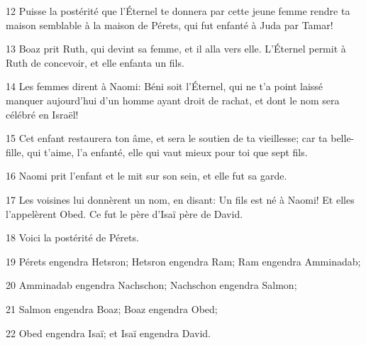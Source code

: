 \par 12 Puisse la postérité que l'Éternel te donnera par cette jeune femme rendre ta maison semblable à la maison de Pérets, qui fut enfanté à Juda par Tamar!
\par 13 Boaz prit Ruth, qui devint sa femme, et il alla vers elle. L'Éternel permit à Ruth de concevoir, et elle enfanta un fils.
\par 14 Les femmes dirent à Naomi: Béni soit l'Éternel, qui ne t'a point laissé manquer aujourd'hui d'un homme ayant droit de rachat, et dont le nom sera célébré en Israël!
\par 15 Cet enfant restaurera ton âme, et sera le soutien de ta vieillesse; car ta belle-fille, qui t'aime, l'a enfanté, elle qui vaut mieux pour toi que sept fils.
\par 16 Naomi prit l'enfant et le mit sur son sein, et elle fut sa garde.
\par 17 Les voisines lui donnèrent un nom, en disant: Un fils est né à Naomi! Et elles l'appelèrent Obed. Ce fut le père d'Isaï père de David.
\par 18 Voici la postérité de Pérets.
\par 19 Pérets engendra Hetsron; Hetsron engendra Ram; Ram engendra Amminadab;
\par 20 Amminadab engendra Nachschon; Nachschon engendra Salmon;
\par 21 Salmon engendra Boaz; Boaz engendra Obed;
\par 22 Obed engendra Isaï; et Isaï engendra David.


